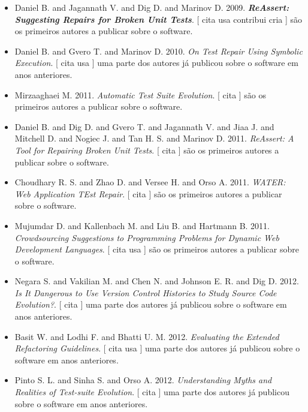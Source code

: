 \begin{itemize}
\item Daniel B. and Jagannath V. and Dig D. and Marinov D.
      2009.
        \textbf{\textit{ ReAssert: Suggesting Repairs for Broken Unit Tests}}.
      [
          cita
          usa
          contribui
          cria
      ]
são os primeiros autores a publicar sobre o software.
\item Daniel B. and Gvero T. and Marinov D.
      2010.
        \textit{ On Test Repair Using Symbolic Execution}.
      [
          cita
          usa
      ]
uma parte dos autores já publicou sobre o software em anos anteriores.
\item Mirzaaghaei M.
      2011.
        \textit{ Automatic Test Suite Evolution}.
      [
          cita
      ]
são os primeiros autores a publicar sobre o software.
\item Daniel B. and Dig D. and Gvero T. and Jagannath V. and Jiaa J. and Mitchell D. and Nogiec J. and Tan H. S. and Marinov D.
      2011.
        \textit{ ReAssert: A Tool for Repairing Broken Unit Tests}.
      [
          cita
      ]
são os primeiros autores a publicar sobre o software.
\item Choudhary R. S. and Zhao D. and Versee H. and Orso A.
      2011.
        \textit{ WATER: Web Application TEst Repair}.
      [
          cita
      ]
são os primeiros autores a publicar sobre o software.
\item Mujumdar D. and Kallenbach M. and Liu B. and Hartmann B.
      2011.
        \textit{ Crowdsourcing Suggestions to Programming Problems for Dynamic Web Development Languages}.
      [
          cita
          usa
      ]
são os primeiros autores a publicar sobre o software.
\item Negara S. and Vakilian M. and Chen N. and Johnson E. R. and Dig D.
      2012.
        \textit{ Is It Dangerous to Use Version Control Histories to Study Source Code Evolution?}.
      [
          cita
      ]
uma parte dos autores já publicou sobre o software em anos anteriores.
\item Basit W. and Lodhi F. and Bhatti U. M.
      2012.
        \textit{ Evaluating the Extended Refactoring Guidelines}.
      [
          cita
          usa
      ]
uma parte dos autores já publicou sobre o software em anos anteriores.
\item Pinto S. L. and Sinha S. and Orso A.
      2012.
        \textit{ Understanding Myths and Realities of Test-suite Evolution}.
      [
          cita
      ]
uma parte dos autores já publicou sobre o software em anos anteriores.

\end{itemize}
